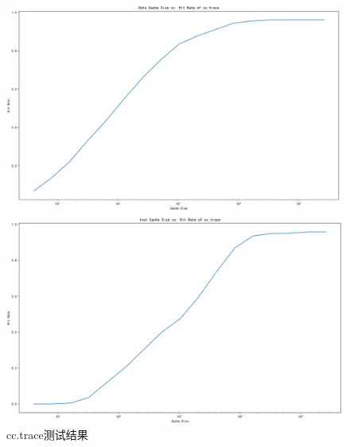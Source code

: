 \documentclass[12pt,hyperref,a4paper,UTF8]{ctexart}
\begin{document}
\begin{figure}[H]
    \centering
    \begin{minipage}[b]{0.45\textwidth}
        \centering
        \includegraphics[width=\textwidth]{./figures/fig/image17.png}
    \end{minipage}
    \hfill
    \begin{minipage}[b]{0.45\textwidth}
        \centering
        \includegraphics[width=\textwidth]{./figures/fig/image18.png}
    \end{minipage}
    \caption{cc.trace测试结果}
\end{figure}
\end{document}
